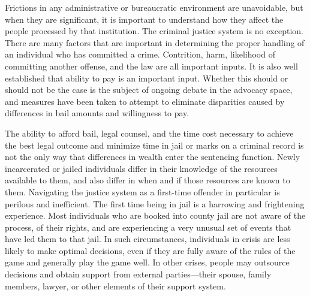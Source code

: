 \documentclass[12pt, a4paper]{article}
\begin{document}



Frictions in any administrative or bureaucratic environment are unavoidable, but when they are significant, it is important to understand how they affect the people processed by that institution. The criminal justice system is no exception. There are many factors that are important in determining the proper handling of an individual who has committed a crime. Contrition, harm, likelihood of committing another offense, and the law are all important inputs. It is also well established that ability to pay is an important input. Whether this should or should not be the case is the subject of ongoing debate in the advocacy space, and measures have been taken to attempt to eliminate disparities caused by differences in bail amounts and willingness to pay. 

The ability to afford bail, legal counsel, and the time cost necessary to achieve the best legal outcome and minimize time in jail or marks on a criminal record is not the only way that differences in wealth enter the sentencing function. Newly incarcerated or jailed individuals differ in their knowledge of the resources available to them, and also differ in when and if those resources are known to them. Navigating the justice system as a first-time offender in particular is perilous and inefficient. The first time being in jail is a harrowing and frightening experience. Most individuals who are booked into county jail are not aware of the process, of their rights, and are experiencing a very unusual set of events that have led them to that jail. In such circumstances, individuals in crisis are less likely to make optimal decisions, even if they are fully aware of the rules of the game and generally play the game well. In other crises, people may outsource decisions and obtain support from external parties—their spouse, family members, lawyer, or other elements of their support system.
\end{document}
